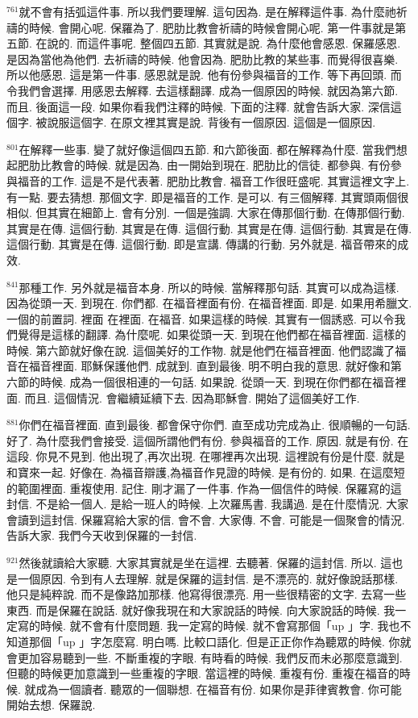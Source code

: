 \documentclass{book}
\begin{document}
$^{761}$就不會有括弧這件事.
所以我們要理解.
這句因為.
是在解釋這件事.
為什麼祂祈禱的時候.
會開心呢.
保羅為了.
肥肋比教會祈禱的時候會開心呢.
第一件事就是第五節.
在說的.
而這件事呢.
整個四五節.
其實就是說.
為什麼他會感恩.
保羅感恩.
是因為當他為他們.
去祈禱的時候.
他會因為.
肥肋比教的某些事.
而覺得很喜樂.
所以他感恩.
這是第一件事.
感恩就是說.
他有份參與福音的工作.
等下再回頭.
而令我們會選擇.
用感恩去解釋.
去這樣翻譯.
成為一個原因的時候.
就因為第六節.
而且.
後面這一段.
如果你看我們注釋的時候.
下面的注釋.
就會告訴大家.
深信這個字.
被說服這個字.
在原文裡其實是說.
背後有一個原因.
這個是一個原因.

$^{801}$在解釋一些事.
變了就好像這個四五節.
和六節後面.
都在解釋為什麼.
當我們想起肥肋比教會的時候.
就是因為.
由一開始到現在.
肥肋比的信徒.
都參與.
有份參與福音的工作.
這是不是代表著.
肥肋比教會.
福音工作很旺盛呢.
其實這裡文字上.
有一點.
要去猜想.
那個文字.
即是福音的工作.
是可以.
有三個解釋.
其實頭兩個很相似.
但其實在細節上.
會有分別.
一個是強調.
大家在傳那個行動.
在傳那個行動.
其實是在傳.
這個行動.
其實是在傳.
這個行動.
其實是在傳.
這個行動.
其實是在傳.
這個行動.
其實是在傳.
這個行動.
即是宣講.
傳講的行動.
另外就是.
福音帶來的成效.

$^{841}$那種工作.
另外就是福音本身.
所以的時候.
當解釋那句話.
其實可以成為這樣.
因為從頭一天.
到現在.
你們都.
在福音裡面有份.
在福音裡面.
即是.
如果用希臘文.
一個的前置詞.
裡面 在裡面.
在福音.
如果這樣的時候.
其實有一個誘惑.
可以令我們覺得是這樣的翻譯.
為什麼呢.
如果從頭一天.
到現在他們都在福音裡面.
這樣的時候.
第六節就好像在說.
這個美好的工作物.
就是他們在福音裡面.
他們認識了福音在福音裡面.
耶穌保護他們.
成就到.
直到最後.
明不明白我的意思.
就好像和第六節的時候.
成為一個很相連的一句話.
如果說.
從頭一天.
到現在你們都在福音裡面.
而且.
這個情況.
會繼續延續下去.
因為耶穌會.
開始了這個美好工作.

$^{881}$你們在福音裡面.
直到最後.
都會保守你們.
直至成功完成為止.
很順暢的一句話.
好了.
為什麼我們會接受.
這個所謂他們有份.
參與福音的工作.
原因.
就是有份.
在這段.
你見不見到.
他出現了,再次出現.
在哪裡再次出現.
這裡說有份是什麼.
就是和寶來一起.
好像在.
為福音辯護,為福音作見證的時候.
是有份的.
如果.
在這麼短的範圍裡面.
重複使用.
記住.
剛才漏了一件事.
作為一個信件的時候.
保羅寫的這封信.
不是給一個人.
是給一班人的時候.
上次羅馬書.
我講過.
是在什麼情況.
大家會讀到這封信.
保羅寫給大家的信.
會不會.
大家傳.
不會.
可能是一個聚會的情況.
告訴大家.
我們今天收到保羅的一封信.

$^{921}$然後就讀給大家聽.
大家其實就是坐在這裡.
去聽著.
保羅的這封信.
所以.
這也是一個原因.
令到有人去理解.
就是保羅的這封信.
是不漂亮的.
就好像說話那樣.
他只是純粹說.
而不是像路加那樣.
他寫得很漂亮.
用一些很精密的文字.
去寫一些東西.
而是保羅在說話.
就好像我現在和大家說話的時候.
向大家說話的時候.
我一定寫的時候.
就不會有什麼問題.
我一定寫的時候.
就不會寫那個「up 」字.
我也不知道那個「up 」字怎麼寫.
明白嗎.
比較口語化.
但是正正你作為聽眾的時候.
你就會更加容易聽到一些.
不斷重複的字眼.
有時看的時候.
我們反而未必那麼意識到.
但聽的時候更加意識到一些重複的字眼.
當這裡的時候.
重複有份.
重複在福音的時候.
就成為一個讀者.
聽眾的一個聯想.
在福音有份.
如果你是菲律賓教會.
你可能開始去想.
保羅說.
\end{document}
